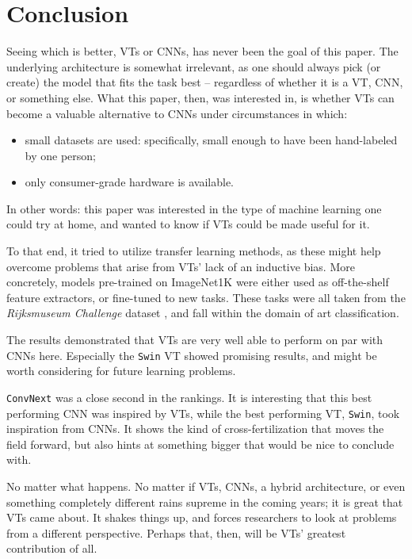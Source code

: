 \section{Conclusion}
Seeing which is better, VTs or CNNs, has never been the goal of this paper. The underlying architecture is somewhat irrelevant, as one should always pick (or create) the model that fits the task best -- regardless of whether it is a VT, CNN, or something else. What this paper, then, was interested in, is whether VTs can become a valuable alternative to CNNs under circumstances in which:
\begin{itemize}
\item small datasets are used: specifically, small enough to have been hand-labeled by one person;
\item only consumer-grade hardware is available.
\end{itemize}
In other words: this paper was interested in the type of machine learning one could try at home, and wanted to know if VTs could be made useful for it.

To that end, it tried to utilize transfer learning methods, as these might help overcome problems that arise from VTs' lack of an inductive bias. More concretely, models pre-trained on ImageNet1K were either used as off-the-shelf feature extractors, or fine-tuned to new tasks. These tasks were all taken from the \textit{Rijksmuseum Challenge} dataset \citep{mensink14icmr}, and fall within the domain of art classification.

The results demonstrated that VTs are very well able to perform on par with CNNs here. Especially the \texttt{Swin} VT showed promising results, and might be worth considering for future learning problems.

\texttt{ConvNext} was a close second in the rankings. It is interesting that this best performing CNN was inspired by VTs, while the best performing VT, \texttt{Swin}, took inspiration from CNNs. It shows the kind of cross-fertilization that moves the field forward, but also hints at something bigger that would be nice to conclude with.

No matter what happens. No matter if VTs, CNNs, a hybrid architecture, or even something completely different rains supreme in the coming years; it is great that VTs came about. It shakes things up, and forces researchers to look at problems from a different perspective. Perhaps that, then, will be VTs' greatest contribution of all.
